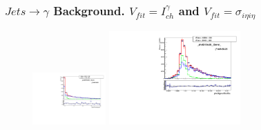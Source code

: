 \begin{frame}\frametitle{$Jets \rightarrow \gamma$ Background. $V_{fit}=I_{ch}^{\gamma}$ and $V_{fit}=\sigma_{i\eta{i\eta}}$}
  \begin{figure}[htb]
    \begin{center}
       \includegraphics[width=0.25\textwidth]{../figs/figs_v11/MUON_WGamma/TemplateFits/c_TEMPL_CHISO_UNblind__phoEt15to20__Barrel__RooFit.pdf} \includegraphics[width=0.45\textwidth]{../figs/figs_v11/MUON_WGamma/TemplateFits/c_TEMPL_SIHIH_UNblind__phoEt15to20__Barrel__RooFit.pdf}
    \end{center}
  \end{figure}
\end{frame}%
